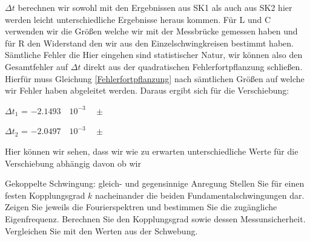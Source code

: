 \documentclass[twoside]{protokoll}
\begin{document}
$\Delta t$ berechnen wir sowohl mit den Ergebnissen aus SK1 als auch aus SK2 hier werden leicht unterschiedliche Ergebnisse heraus kommen. 
Für L und C verwenden wir die Größen welche wir mit der Messbrücke gemessen haben und für R den Widerstand den wir aus den Einzelschwingkreisen bestimmt haben. \\

Sämtliche Fehler die Hier eingehen sind statistischer Natur, wir können also den Gesamtfehler auf $\Delta t$ direkt aus der quadratischen Fehlerfortpflanzung schließen.
Hierfür muss Gleichung \ref{Fehlerfortpflanzung} nach sämtlichen Größen auf welche wir Fehler haben abgeleitet werden. Daraus ergibt sich für die Verschiebung:
\begin{center}
$\Delta t_1$ = $-2.1493 \quad 10^{-3} \quad \pm $
\end{center}
\begin{center}
$\Delta t_2$ = $-2.0497 \quad 10^{-3} \quad \pm $
\end{center}

Hier können wir sehen, dass wir wie zu erwarten unterschiedliche Werte für die Verschiebung abhängig davon ob wir 

\begin{aufgabe}{Gekoppelte Schwingung: gleich- und gegensinnige Anregung}
  Stellen Sie für einen festen Kopplungsgrad $k$ nacheinander die
  beiden Fundamentalschwingungen dar. Zeigen Sie jeweils die
  Fourierspektren und bestimmen Sie die zugängliche
  Eigenfrequenz. Berechnen Sie den Kopplungsgrad sowie dessen
  Messunsicherheit. Vergleichen Sie mit den Werten aus der Schwebung.
\end{aufgabe}
   
   
\end{document}
